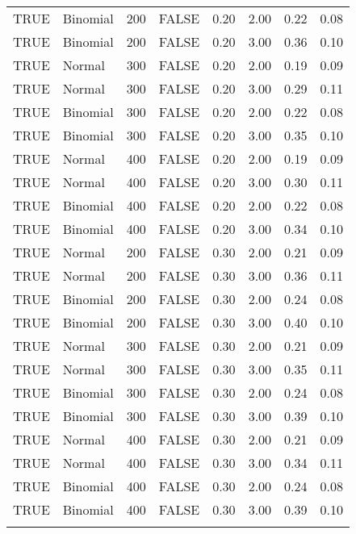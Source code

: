 \begin{longtable}{llrlrrrr}
  TRUE & Binomial & 200 & FALSE & 0.20 & 2.00 & 0.22 & 0.08 \\ 
  TRUE & Binomial & 200 & FALSE & 0.20 & 3.00 & 0.36 & 0.10 \\ 
  TRUE & Normal & 300 & FALSE & 0.20 & 2.00 & 0.19 & 0.09 \\ 
  TRUE & Normal & 300 & FALSE & 0.20 & 3.00 & 0.29 & 0.11 \\ 
  TRUE & Binomial & 300 & FALSE & 0.20 & 2.00 & 0.22 & 0.08 \\ 
  TRUE & Binomial & 300 & FALSE & 0.20 & 3.00 & 0.35 & 0.10 \\ 
  TRUE & Normal & 400 & FALSE & 0.20 & 2.00 & 0.19 & 0.09 \\ 
  TRUE & Normal & 400 & FALSE & 0.20 & 3.00 & 0.30 & 0.11 \\ 
  TRUE & Binomial & 400 & FALSE & 0.20 & 2.00 & 0.22 & 0.08 \\ 
  TRUE & Binomial & 400 & FALSE & 0.20 & 3.00 & 0.34 & 0.10 \\ 
  TRUE & Normal & 200 & FALSE & 0.30 & 2.00 & 0.21 & 0.09 \\ 
  TRUE & Normal & 200 & FALSE & 0.30 & 3.00 & 0.36 & 0.11 \\ 
  TRUE & Binomial & 200 & FALSE & 0.30 & 2.00 & 0.24 & 0.08 \\ 
  TRUE & Binomial & 200 & FALSE & 0.30 & 3.00 & 0.40 & 0.10 \\ 
  TRUE & Normal & 300 & FALSE & 0.30 & 2.00 & 0.21 & 0.09 \\ 
  TRUE & Normal & 300 & FALSE & 0.30 & 3.00 & 0.35 & 0.11 \\ 
  TRUE & Binomial & 300 & FALSE & 0.30 & 2.00 & 0.24 & 0.08 \\ 
  TRUE & Binomial & 300 & FALSE & 0.30 & 3.00 & 0.39 & 0.10 \\ 
  TRUE & Normal & 400 & FALSE & 0.30 & 2.00 & 0.21 & 0.09 \\ 
  TRUE & Normal & 400 & FALSE & 0.30 & 3.00 & 0.34 & 0.11 \\ 
  TRUE & Binomial & 400 & FALSE & 0.30 & 2.00 & 0.24 & 0.08 \\ 
  TRUE & Binomial & 400 & FALSE & 0.30 & 3.00 & 0.39 & 0.10 \\ 
   \hline
\hline
\caption{} 
\end{longtable}
